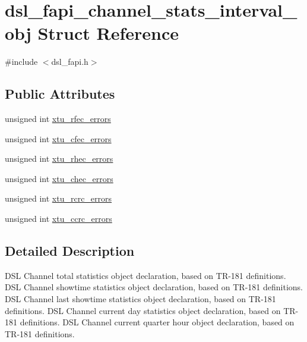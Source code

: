 \hypertarget{structdsl__fapi__channel__stats__interval__obj}{\section{dsl\-\_\-fapi\-\_\-channel\-\_\-stats\-\_\-interval\-\_\-obj Struct Reference}
\label{structdsl__fapi__channel__stats__interval__obj}
}


{\ttfamily \#include $<$dsl\-\_\-fapi.\-h$>$}

\subsection*{Public Attributes}
\begin{DoxyCompactItemize}
\item 
unsigned int \hyperlink{structdsl__fapi__channel__stats__interval__obj_a731008204d97ec25bd89d3ac3c2ed7aa}{xtu\-\_\-rfec\-\_\-errors}
\item 
unsigned int \hyperlink{structdsl__fapi__channel__stats__interval__obj_af819a585cceb04f1d9c95082442318e2}{xtu\-\_\-cfec\-\_\-errors}
\item 
unsigned int \hyperlink{structdsl__fapi__channel__stats__interval__obj_ad9b8601436c226deb150bb49bb70ec2f}{xtu\-\_\-rhec\-\_\-errors}
\item 
unsigned int \hyperlink{structdsl__fapi__channel__stats__interval__obj_ac0de9e7853f8afe8b8d55a683ab68da2}{xtu\-\_\-chec\-\_\-errors}
\item 
unsigned int \hyperlink{structdsl__fapi__channel__stats__interval__obj_a87fec32ef4830259193a62bbe6639eaf}{xtu\-\_\-rcrc\-\_\-errors}
\item 
unsigned int \hyperlink{structdsl__fapi__channel__stats__interval__obj_a20758418fd88fbef1953137ba98cc341}{xtu\-\_\-ccrc\-\_\-errors}
\end{DoxyCompactItemize}


\subsection{Detailed Description}
D\-S\-L Channel total statistics object declaration, based on T\-R-\/181 definitions. D\-S\-L Channel showtime statistics object declaration, based on T\-R-\/181 definitions. D\-S\-L Channel last showtime statistics object declaration, based on T\-R-\/181 definitions. D\-S\-L Channel current day statistics object declaration, based on T\-R-\/181 definitions. D\-S\-L Channel current quarter hour object declaration, based on T\-R-\/181 definitions. 

